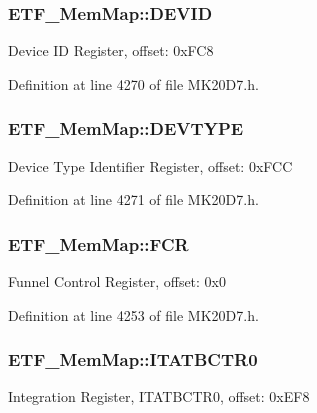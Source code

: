 \subsubsection[{\texorpdfstring{D\+E\+V\+ID}{DEVID}}]{ E\+T\+F\+\_\+\+Mem\+Map\+::\+D\+E\+V\+ID}\hypertarget{struct_e_t_f___mem_map_aee80b184feed55cdc9d611672417d6e6}{}\label{struct_e_t_f___mem_map_aee80b184feed55cdc9d611672417d6e6}
Device ID Register, offset\+: 0x\+F\+C8 

Definition at line 4270 of file M\+K20\+D7.\+h.

\subsubsection[{\texorpdfstring{D\+E\+V\+T\+Y\+PE}{DEVTYPE}}]{ E\+T\+F\+\_\+\+Mem\+Map\+::\+D\+E\+V\+T\+Y\+PE}\hypertarget{struct_e_t_f___mem_map_a6bc4c22708e71bde72f0c04236c471c5}{}\label{struct_e_t_f___mem_map_a6bc4c22708e71bde72f0c04236c471c5}
Device Type Identifier Register, offset\+: 0x\+F\+CC 

Definition at line 4271 of file M\+K20\+D7.\+h.

\subsubsection[{\texorpdfstring{F\+CR}{FCR}}]{ E\+T\+F\+\_\+\+Mem\+Map\+::\+F\+CR}\hypertarget{struct_e_t_f___mem_map_ad893993c7fca4a17b0e50d48283dc8a4}{}\label{struct_e_t_f___mem_map_ad893993c7fca4a17b0e50d48283dc8a4}
Funnel Control Register, offset\+: 0x0 

Definition at line 4253 of file M\+K20\+D7.\+h.

\subsubsection[{\texorpdfstring{I\+T\+A\+T\+B\+C\+T\+R0}{ITATBCTR0}}]{ E\+T\+F\+\_\+\+Mem\+Map\+::\+I\+T\+A\+T\+B\+C\+T\+R0}\hypertarget{struct_e_t_f___mem_map_a25f602259e8235c0a7d5a95d27a0ad8d}{}\label{struct_e_t_f___mem_map_a25f602259e8235c0a7d5a95d27a0ad8d}
Integration Register, I\+T\+A\+T\+B\+C\+T\+R0, offset\+: 0x\+E\+F8 

